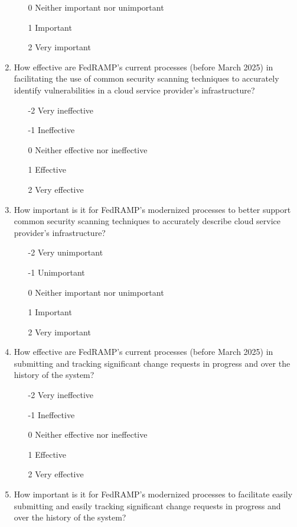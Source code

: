 \documentclass{jdf}
\begin{document}
\begin{enumerate}
\begin{enumerate}
        \item  [0] Neither important nor unimportant
        \item  [1] Important
        \item  [2] Very important
    \end{enumerate}
    \item How effective are FedRAMP's current processes (before March 2025) in facilitating the use of common security scanning techniques to accurately identify vulnerabilities in a cloud service provider's infrastructure?
    \begin{enumerate}
        \item [-2] Very ineffective
        \item [-1] Ineffective
        \item  [0] Neither effective nor ineffective
        \item  [1] Effective 
        \item  [2] Very effective
    \end{enumerate}
    \item How important is it for FedRAMP's modernized processes to better support common security scanning techniques to accurately describe cloud service provider's infrastructure?
    \begin{enumerate}
        \item [-2] Very unimportant
        \item [-1] Unimportant
        \item  [0] Neither important nor unimportant
        \item  [1] Important
        \item  [2] Very important
    \end{enumerate}
    \item How effective are FedRAMP's current processes (before March 2025) in submitting and tracking significant change requests in progress and over the history of the system?
    \begin{enumerate}
        \item [-2] Very ineffective
        \item [-1] Ineffective
        \item  [0] Neither effective nor ineffective
        \item  [1] Effective 
        \item  [2] Very effective
    \end{enumerate}
    \item How important is it for FedRAMP's modernized processes to facilitate easily submitting and easily tracking significant change requests in progress and over the history of the system?

\end{enumerate}
\end{document}
